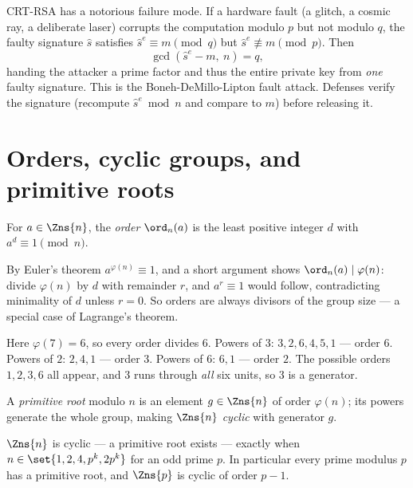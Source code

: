 \begin{attackbox}
CRT-RSA has a notorious failure mode. If a hardware fault (a glitch, a cosmic ray, a deliberate
laser) corrupts the computation modulo $p$ but not modulo $q$, the faulty signature $\hat s$
satisfies $\hat s^e \equiv m \pmod q$ but $\hat s^e \not\equiv m\pmod p$. Then
\[
  \gcd(\hat s^e - m,\ n) = q,
\]
handing the attacker a prime factor and thus the entire private key from \emph{one} faulty
signature. This is the Boneh-DeMillo-Lipton fault attack. Defenses verify the signature (recompute
$\hat s^e \bmod n$ and compare to $m$) before releasing it.
\end{attackbox}

\section{Orders, cyclic groups, and primitive roots}
\label{ch40:orders}

\begin{definition}
\label{ch40:def-order}
For $a\in\Zns{n}$, the \emph{order} $\ord_n(a)$ is the least positive integer $d$ with $a^d\equiv 1
\pmod n$.
\end{definition}

By Euler's theorem $a^{\varphi(n)}\equiv 1$, and a short argument shows $\ord_n(a)\mid\varphi(n)$:
divide $\varphi(n)$ by $d$ with remainder $r$, and $a^{r}\equiv 1$ would follow, contradicting
minimality of $d$ unless $r=0$. So orders are always divisors of the group size --- a special case of
Lagrange's theorem.

\begin{example}
\label{ch40:ex-order}
Here $\varphi(7)=6$, so every order divides $6$. Powers of $3$: $3,2,6,4,5,1$ --- order $6$. Powers
of $2$: $2,4,1$ --- order $3$. Powers of $6$: $6,1$ --- order $2$. The possible orders $1,2,3,6$ all
appear, and $3$ runs through \emph{all} six units, so $3$ is a generator.
\end{example}

\begin{definition}
\label{ch40:def-primroot}
A \emph{primitive root} modulo $n$ is an element $g\in\Zns{n}$ of order $\varphi(n)$; its powers
generate the whole group, making $\Zns{n}$ \emph{cyclic} with generator $g$.
\end{definition}

\begin{theorem}
\label{ch40:thm-primroot}
$\Zns{n}$ is cyclic --- a primitive root exists --- exactly when $n\in\set{1,2,4,p^k,2p^k}$ for an
odd prime $p$. In particular every prime modulus $p$ has a primitive root, and $\Zns{p}$ is cyclic
of order $p-1$.
\end{theorem}

